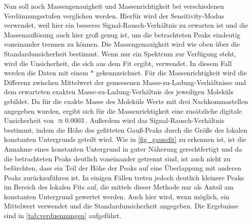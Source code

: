 Nun soll noch Massengenauigkeit und Massenrichtigkeit bei verschiedenen Verdünnungsstufen verglichen werden.
Hierfür wird der Sensitivity-Modus verwendet, weil hier ein besseres Signal-Rausch-Verhältnis zu erwarten ist und die Massenauflösung auch hier groß genug ist, um die betrachteten Peaks eindeutig voneinander trennen zu können.
Die Massengenauigkeit wird wie oben über die Standardunsicherheit bestimmt.
Wenn nur ein Spektrum zur Verfügung steht, wird die Unsicherheit, die sich aus dem Fit ergibt, verwendet.
In diesem Fall werden die Daten mit einem $*$ gekennzeichnet.
Für die Massenrichtigkeit wird die Differenz zwischen Mittelwert der gemessenen Masse-zu-Ladung-Verhältnisse und dem erwarteten exakten Masse-zu-Ladung-Verhältnis des jeweiligen Moleküls gebildet.
Da für die exakte Masse des Moleküls Werte mit drei Nachkommastellen angegeben wurden, ergibt sich für die Massenrichtigkeit eine zusätzliche digitale Unsicherheit von $\approxeq \SI{0.0003}{}$.
Außerdem wird das Signal-Rausch-Verhältnis bestimmt, indem die Höhe des gefitteten Gauß-Peaks durch die Größe des lokalen konstanten Untergrunds geteilt wird.
Wie in \cref{fig_gaussfit} zu erkennen ist, ist die Annahme eines konstanten Untergrund in guter Näherung gerechtfertigt und da die betrachteten Peaks deutlich voneinander getrennt sind, ist auch nicht zu befürchten, dass ein Teil der Höhe der Peaks auf eine Überlappung mit anderen Peaks zurückzuführen ist.
In einigen Fällen treten jedoch deutlich kleinere Peaks im Bereich des lokalen Fits auf, die mittels dieser Methode nur als Anteil am konstanten Untergrund gewertet werden.
Auch hier wird, wenn möglich, ein Mittelwert verwendet und die Standardunsicherheit angegeben.
Die Ergebnisse sind in \cref{tab:verduennungen} aufgeführt.

